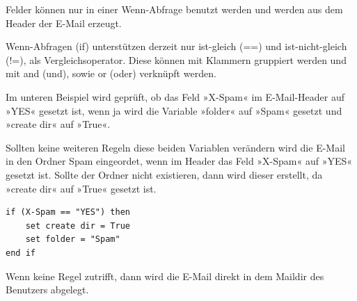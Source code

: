 \documentclass[a4paper,10pt]{article}
\newcounter{subsubsubsection}[subsubsection]
\begin{document}

Felder können nur in einer Wenn-Abfrage benutzt werden und werden aus dem Header der E-Mail erzeugt.


Wenn-Abfragen (if) unterstützen derzeit nur ist-gleich (==) und ist-nicht-gleich (!=), als Vergleichsoperator. Diese können mit Klammern gruppiert werden und mit and (und), sowie or (oder) verknüpft werden.


Im unteren Beispiel wird geprüft, ob das Feld »X-Spam« im E-Mail-Header auf »YES« gesetzt ist, wenn ja wird die Variable »folder« auf »Spam« gesetzt und »create dir« auf »True«.

Sollten keine weiteren Regeln diese beiden Variablen verändern wird die E-Mail in den Ordner Spam eingeordet, wenn im Header das Feld »X-Spam« auf »YES« gesetzt ist. Sollte der Ordner nicht existieren, dann wird dieser erstellt, da »create dir« auf »True« gesetzt ist.

\begin{lstlisting}
if (X-Spam == "YES") then
    set create dir = True
    set folder = "Spam"
end if 
\end{lstlisting}

Wenn keine Regel zutrifft, dann wird die E-Mail direkt in dem Maildir des Benutzers abgelegt.
\end{document}

